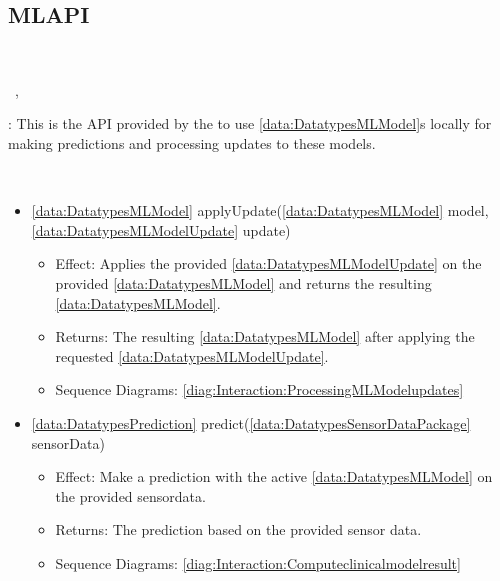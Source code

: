   \subsection{MLAPI}\label{int:InterfacesMLAPI}
    \begin{description}
      \item[Provided by:] \iconcomponent{}~
      \item[Required by:] \iconcomponent{}~, \iconcomponent{}~ 
           \item[Description]: This is the API provided by the  to use \ref{data:DatatypesMLModel}s locally for making predictions and processing updates to these models.
      \item[Operations:] ~
    \begin{itemize}[noitemsep,nolistsep,leftmargin=-.25cm]
      \item \textsf{\ref{data:DatatypesMLModel} applyUpdate(\ref{data:DatatypesMLModel} model, \ref{data:DatatypesMLModelUpdate} update)}
        \begin{itemize}[noitemsep,nolistsep]
           \item Effect: Applies the provided \ref{data:DatatypesMLModelUpdate} on the provided \ref{data:DatatypesMLModel} and returns the resulting \ref{data:DatatypesMLModel}. 
           \item Returns: The resulting \ref{data:DatatypesMLModel} after applying the requested \ref{data:DatatypesMLModelUpdate}.
           \item Sequence Diagrams: \cref{diag:Interaction:ProcessingMLModelupdates}
        \end{itemize}
      \item \textsf{\ref{data:DatatypesPrediction} predict(\ref{data:DatatypesSensorDataPackage} sensorData)}
        \begin{itemize}[noitemsep,nolistsep]
           \item Effect: Make a prediction with the active \ref{data:DatatypesMLModel} on the provided sensordata. 
           \item Returns: The prediction based on the provided sensor data.
           \item Sequence Diagrams: \cref{diag:Interaction:Computeclinicalmodelresult}
        \end{itemize}

\end{itemize}
\end{description}
